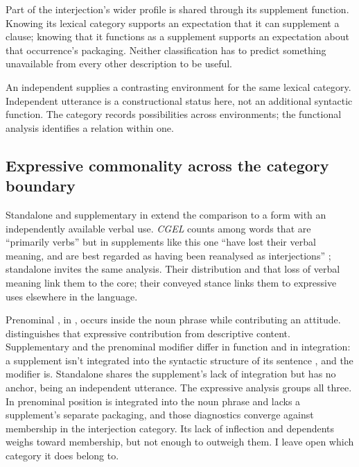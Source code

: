 \documentclass[12pt]{article}
\begin{document}
Part of the interjection's wider profile is shared through its supplement
function. Knowing its lexical category supports an expectation that it can
supplement a clause; knowing that it functions as a supplement supports an
expectation about that occurrence's packaging. Neither classification has to
predict something unavailable from every other description to be useful.

An independent  supplies a contrasting environment for
the same lexical category. Independent utterance is a constructional
status here, not an additional syntactic function. The category records
possibilities across environments; the functional analysis identifies a
relation within one.

\subsection{Expressive commonality across the category boundary}\label{sec:damn-profiles}

Standalone  and supplementary  in
 extend the comparison to a form
with an independently available verbal use. \textit{CGEL} counts
 among words that are \enquote{primarily verbs} but in
supplements like this one \enquote{have lost their verbal meaning, and are
best regarded as having been reanalysed as interjections}
\citep[1361]{HuddlestonPullum2002}; standalone  invites the
same analysis. Their distribution and that loss of verbal meaning link them
to the core; their conveyed stance links them to
expressive uses elsewhere in the language.

Prenominal , in , occurs inside the
noun phrase while contributing an attitude. \textcite[166, 181]{potts2007}
distinguishes that expressive contribution from descriptive content.
Supplementary  and the prenominal modifier differ in function
and in integration: a supplement isn't integrated into the syntactic
structure of its sentence \citep[1350]{HuddlestonPullum2002}, and the
modifier is. Standalone  shares the supplement's lack of
integration but has no anchor, being an independent utterance. The
expressive analysis groups all three. In prenominal position 
is integrated into the noun phrase and lacks a supplement's separate
packaging, and those diagnostics converge against membership in the
interjection category. Its lack of inflection and dependents weighs
toward membership, but not enough to outweigh them. I leave
open which category it does belong to.
\end{document}
